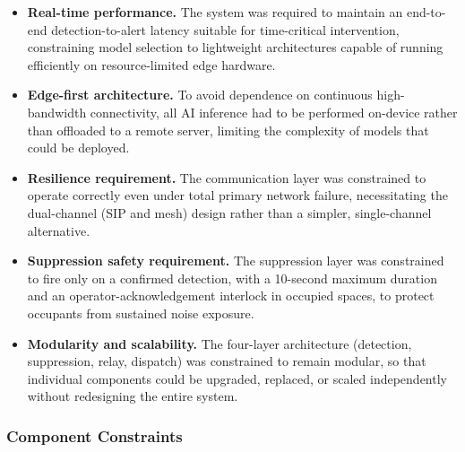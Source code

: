 \begin{itemize}
\item \textbf{Real-time performance.} The system was required to maintain an end-to-end detection-to-alert latency suitable for time-critical intervention, constraining model selection to lightweight architectures capable of running efficiently on resource-limited edge hardware.

\item \textbf{Edge-first architecture.} To avoid dependence on continuous high-bandwidth connectivity, all AI inference had to be performed on-device rather than offloaded to a remote server, limiting the complexity of models that could be deployed.

\item \textbf{Resilience requirement.} The communication layer was constrained to operate correctly even under total primary network failure, necessitating the dual-channel (SIP and mesh) design rather than a simpler, single-channel alternative.

\item \textbf{Suppression safety requirement.} The suppression layer was constrained to fire only on a confirmed detection, with a 10-second maximum duration and an operator-acknowledgement interlock in occupied spaces, to protect occupants from sustained noise exposure.

\item \textbf{Modularity and scalability.} The four-layer architecture (detection, suppression, relay, dispatch) was constrained to remain modular, so that individual components could be upgraded, replaced, or scaled independently without redesigning the entire system.
\end{itemize}

\subsubsection{Component Constraints}

